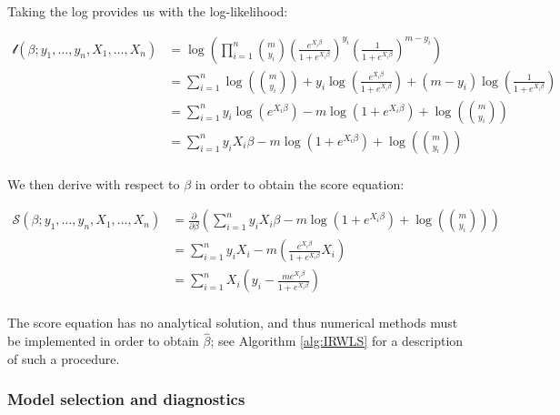 \documentclass{report}
\begin{document}
Taking the log provides us with the log-likelihood:

\begin{equation}\label{eq:glm-logistic-loglik}
    \begin{aligned}
        \mathcal{l}(\beta; y_1, \dots, y_n, X_1, \dots, X_n)
          &= \log\left(\prod_{i=1}^n \binom{m}{y_i}\left(\frac{e^{X_i\beta}}{1 + e^{X_i\beta}}\right)^{y_i}\left(\frac{1}{1+e^{X_i\beta}}\right)^{m-y_i}\right) \\
          &= \sum_{i=1}^n \log\left(\binom{m}{y_i}\right) + y_i\log\left(\frac{e^{X_i\beta}}{1+e^{X_i\beta}}\right) + (m-y_i)\log\left(\frac{1}{1+e^{X_i\beta}}\right) \\
          &= \sum_{i=1}^n y_i \log\left(e^{X_i\beta}\right) -m\log\left(1 + e^{X_i\beta}\right) + \log\left(\binom{m}{y_i}\right) \\
          &= \sum_{i=1}^n y_iX_i\beta - m\log\left(1 + e^{X_i\beta}\right) + \log\left(\binom{m}{y_i}\right) \\
    \end{aligned}
\end{equation}

We then derive with respect to $\beta$ in order to obtain the score equation:

\begin{equation}\label{eq:glm-logistic-score-equation}
    \begin{aligned}
        \mathcal{S}(\beta; y_1, \dots, y_n, X_1, \dots, X_n)
          &= \frac{\partial}{\partial\beta} \left(\sum_{i=1}^n y_iX_i\beta - m\log\left(1 + e^{X_i\beta}\right) + \log\left(\binom{m}{y_i}\right)\right) \\
          &= \sum_{i=1}^n y_iX_i -m\left(\frac{e^{X_i\beta}}{1+e^{X_i\beta}}X_i\right) \\
          &= \sum_{i=1}^n X_i\left(y_i - \frac{me^{X_i\beta}}{1+e^{X_i\beta}}\right) \\
    \end{aligned}
\end{equation}

The score equation has no analytical solution, and thus numerical methods must be implemented in order to obtain $\hat{\beta}$; see Algorithm \ref{alg:IRWLS} for a description of such a procedure. 

\subsubsection{Model selection and diagnostics}
\end{document}
